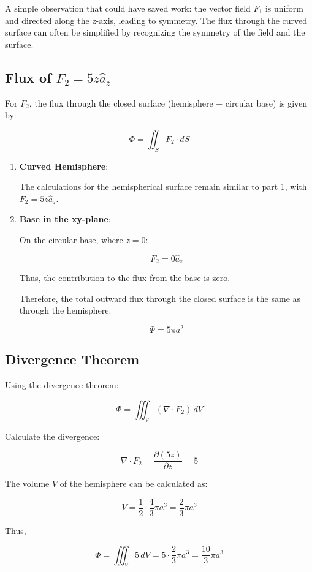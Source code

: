 \documentclass[a4paper,12pt]{article}
\begin{document}
A simple observation that could have saved work: the vector field \( F_1 \) is uniform and directed along the z-axis, leading to symmetry. The flux through the curved surface can often be simplified by recognizing the symmetry of the field and the surface.

\subsection{Flux of \( F_2 = 5z \hat{a}_z \)}

For \( F_2 \), the flux through the closed surface (hemisphere + circular base) is given by:

\[
\Phi = \iint_S F_2 \cdot dS
\]

\begin{enumerate}
    \item \textbf{Curved Hemisphere}:

    The calculations for the hemispherical surface remain similar to part 1, with \( F_2 = 5z \hat{a}_z \).

    \item \textbf{Base in the xy-plane}:

    On the circular base, where \( z = 0 \):

    \[
    F_2 = 0 \hat{a}_z
    \]

    Thus, the contribution to the flux from the base is zero.

    Therefore, the total outward flux through the closed surface is the same as through the hemisphere:

    \[
    \Phi = 5\pi a^2
    \]
\end{enumerate}

\subsection{Divergence Theorem}

Using the divergence theorem:

\[
\Phi = \iiint_V (\nabla \cdot F_2) \, dV
\]

Calculate the divergence:

\[
\nabla \cdot F_2 = \frac{\partial (5z)}{\partial z} = 5
\]

The volume \( V \) of the hemisphere can be calculated as:

\[
V = \frac{1}{2} \cdot \frac{4}{3}\pi a^3 = \frac{2}{3}\pi a^3
\]

Thus,

\[
\Phi = \iiint_V 5 \, dV = 5 \cdot \frac{2}{3}\pi a^3 = \frac{10}{3}\pi a^3
\]
\end{document}
